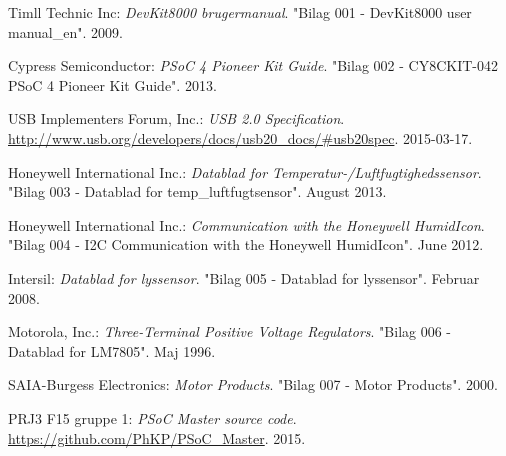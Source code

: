 \renewcommand{\bibname}{Litteraturliste}
\begin{thebibliography}{2}

 Timll Technic Inc: \textit{DevKit8000 brugermanual}. "Bilag 001 - DevKit8000 user manual\_en". 2009.

 Cypress Semiconductor: \textit{PSoC 4 Pioneer Kit Guide}. "Bilag 002 - CY8CKIT-042 PSoC 4 Pioneer Kit Guide". 2013.


 USB Implementers Forum, Inc.: \textit{USB 2.0 Specification}. \url{http://www.usb.org/developers/docs/usb20_docs/#usb20spec}. 2015-03-17.

 Honeywell International Inc.: \textit{Datablad for Temperatur-/Luftfugtighedssensor}. "Bilag 003 - Datablad for temp\_luftfugtsensor". August 2013.

 Honeywell International Inc.: \textit{\IIC Communication with the Honeywell HumidIcon}. "Bilag 004 - I2C Communication with the Honeywell HumidIcon". June 2012.

 Intersil: \textit{Datablad for lyssensor}. "Bilag 005 - Datablad for lyssensor". Februar 2008.

 Motorola, Inc.: \textit{Three-Terminal Positive Voltage Regulators}. "Bilag 006 - Datablad for LM7805". Maj 1996.

 SAIA-Burgess Electronics: \textit{Motor Products}. "Bilag 007 - Motor Products". 2000.

 PRJ3 F15 gruppe 1: \textit{PSoC Master source code}. \url{https://github.com/PhKP/PSoC_Master}. 2015.

\end{thebibliography}